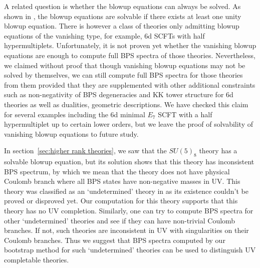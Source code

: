 A related question is whether the blowup equations can always be solved. As shown in \cite{Huang:2017mis}, the blowup equations are solvable if there exists at least one unity blowup equation. There is however a class of theories only admitting blowup equations of the vanishing type, for example, 6d SCFTs with half hypermultiplets. Unfortunately, it is not proven yet whether the vanishing blowup equations are enough to compute full BPS spectra of those theories. Nevertheless, we claimed without proof that though vanishing blowup equations may not be solved by themselves, we can still compute full BPS spectra for those theories from them provided that they are supplemented with other additional constraints such as non-negativity of BPS degeneracies and KK tower structure for 6d theories as well as dualities, geometric descriptions. We have checked this claim for several examples including the 6d minimal $E_7$ SCFT with a half hypermultiplet up to certain lower orders, but we leave the proof of solvability of vanishing blowup equations to future study.

In section~\ref{sec:higher rank theories}, we saw that the $SU(5)_8$ theory has a solvable blowup equation, but its solution shows that this theory has inconsistent BPS spectrum, by which we mean that the theory does not have physical Coulomb branch where all BPS states have non-negative masses in UV. This theory was classified as an `undetermined' theory in \cite{Bhardwaj:2020gyu} as its existence couldn't be proved or disproved yet. Our computation for this theory supports that this theory has no UV completion. Similarly, one can try to compute BPS spectra for other `undetermined' theories and see if they can have non-trivial Coulomb branches. If not, such theories are inconsistent in UV with singularities on their Coulomb branches. Thus we suggest that BPS spectra computed by our bootstrap method for such `undetermined' theories can be used to distinguish UV completable theories.

